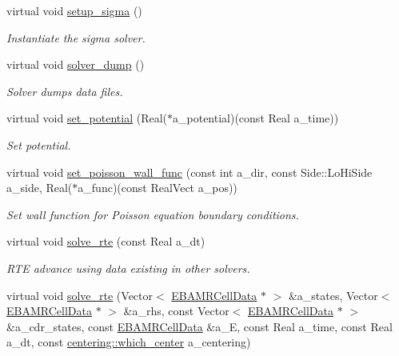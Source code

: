 \begin{DoxyCompactItemize}
virtual void \hyperlink{classtime__stepper_a481326a9d61f88b18c78034239fd52b2}{setup\+\_\+sigma} ()
\begin{DoxyCompactList}\small\item\em Instantiate the sigma solver. \end{DoxyCompactList}\item 
virtual void \hyperlink{classtime__stepper_ad8e1679b0a90f7acf6f4349da2299ecb}{solver\+\_\+dump} ()
\begin{DoxyCompactList}\small\item\em Solver dumps data files. \end{DoxyCompactList}\item 
virtual void \hyperlink{classtime__stepper_a1a87be490eeae1b459d81499f10e8304}{set\+\_\+potential} (Real($\ast$a\+\_\+potential)(const Real a\+\_\+time))
\begin{DoxyCompactList}\small\item\em Set potential. \end{DoxyCompactList}\item 
virtual void \hyperlink{classtime__stepper_a8a998a61bbd18a33ad22b7411681e4e6}{set\+\_\+poisson\+\_\+wall\+\_\+func} (const int a\+\_\+dir, const Side\+::\+Lo\+Hi\+Side a\+\_\+side, Real($\ast$a\+\_\+func)(const Real\+Vect a\+\_\+pos))
\begin{DoxyCompactList}\small\item\em Set wall function for Poisson equation boundary conditions. \end{DoxyCompactList}\item 
virtual void \hyperlink{classtime__stepper_a1246e40615f329e64c0acecbc3efc391}{solve\+\_\+rte} (const Real a\+\_\+dt)
\begin{DoxyCompactList}\small\item\em R\+TE advance using data existing in other solvers. \end{DoxyCompactList}\item 
virtual void \hyperlink{classtime__stepper_ac393f6db09ac092352138877d9790214}{solve\+\_\+rte} (Vector$<$ \hyperlink{type__definitions_8H_a7e610f301989e5e07781c5e338bdb7c3}{E\+B\+A\+M\+R\+Cell\+Data} $\ast$ $>$ \&a\+\_\+states, Vector$<$ \hyperlink{type__definitions_8H_a7e610f301989e5e07781c5e338bdb7c3}{E\+B\+A\+M\+R\+Cell\+Data} $\ast$ $>$ \&a\+\_\+rhs, const Vector$<$ \hyperlink{type__definitions_8H_a7e610f301989e5e07781c5e338bdb7c3}{E\+B\+A\+M\+R\+Cell\+Data} $\ast$ $>$ \&a\+\_\+cdr\+\_\+states, const \hyperlink{type__definitions_8H_a7e610f301989e5e07781c5e338bdb7c3}{E\+B\+A\+M\+R\+Cell\+Data} \&a\+\_\+E, const Real a\+\_\+time, const Real a\+\_\+dt, const \hyperlink{namespacecentering_a2cba3891fbdab30a214ce001478b0c00}{centering\+::which\+\_\+center} a\+\_\+centering)

\end{DoxyCompactItemize}
